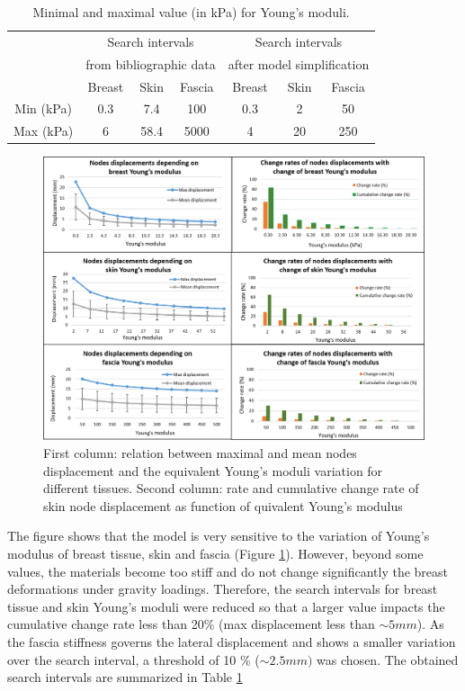 \begin{table}[!h]
\centering
\begin{tabular}{|c||c|c|c||c|c|c|}
\hline
&\multicolumn{3}{|c||}{Search intervals}& \multicolumn{3}{c|}{Search intervals}\\
&\multicolumn{3}{|c||}{ from bibliographic data}& \multicolumn{3}{c|}{ after model simplification}\\
\hline
\hline
& Breast & Skin & Fascia & Breast & Skin & Fascia \\
\hline
Min (kPa)  & 0.3 & 7.4 & 100 & 0.3 & 2 & 50\\
\hline
Max (kPa) & 6 & 58.4 & 5000& 4& 20 &250 \\
\hline
\end{tabular}
\caption{Minimal and maximal value (in kPa) for Young's moduli.}
\label{table:minandmaxelasticmodulus}
\end{table}

\begin{figure}[!h]
\centering
\includegraphics[width=\textwidth,keepaspectratio]{figures/materialPropDiscretization.png} 
\caption{First column: relation between maximal and mean nodes displacement and the equivalent Young's moduli variation for different tissues. Second column: rate and cumulative change rate of skin node displacement as function of quivalent Young's modulus}\label{fig:materialPropDiscretization}
\end{figure}

The figure shows that the model is very sensitive to the variation of Young’s modulus of breast tissue, skin and fascia (Figure \ref{fig:materialPropDiscretization}). However, beyond some values, the materials become too stiff and do not change significantly the breast deformations under gravity loadings.  Therefore, the search intervals for breast tissue and skin Young's moduli were reduced so that a larger value impacts the cumulative change rate less than 20\% (max displacement less than $\sim 5mm$). As the fascia stiffness governs the lateral displacement and shows a smaller variation over the search interval, a threshold of 10 \% ($\sim 2.5mm)$ was chosen. The obtained search intervals are summarized in Table \ref{table:minandmaxelasticmodulus} 




